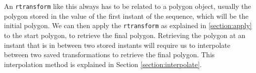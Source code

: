 An \lstinline{rtransform} like this always has to be related to a polygon object, usually the polygon stored in the value of the first instant of the sequence, which will be the initial polygon. We can then apply the \lstinline{rtransform} as explained in \ref{section:apply} to the start polygon, to retrieve the final polygon. Retrieving the polygon at an instant that is in between two stored instants will require us to interpolate between two saved transformations to retrieve the final polygon. This interpolation method is explained in Section \ref{section:interpolate}.

